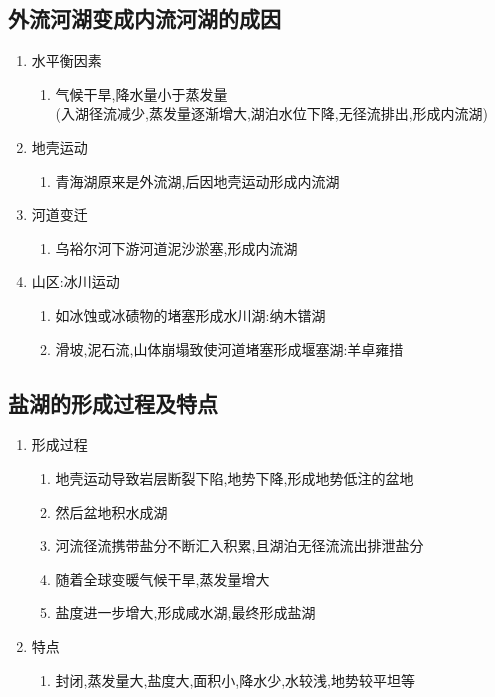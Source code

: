 \documentclass[a4paper]{article}
\begin{document}
    \subsection{外流河湖变成内流河湖的成因}
    \begin{enumerate}
        \item 水平衡因素
        \begin{enumerate}
            \item 气候干旱,降水量小于蒸发量\\(入湖径流减少,蒸发量逐渐增大,湖泊水位下降,无径流排出,形成内流湖)
        \end{enumerate}
        \item 地壳运动
        \begin{enumerate}
            \item 青海湖原来是外流湖,后因地壳运动形成内流湖
        \end{enumerate}
        \item 河道变迁
        \begin{enumerate}
            \item 乌裕尔河下游河道泥沙淤塞,形成内流湖
        \end{enumerate}
        \item 山区:冰川运动
        \begin{enumerate}
            \item 如冰蚀或冰碛物的堵塞形成水川湖:纳木镨湖
            \item 滑坡,泥石流,山体崩塌致使河道堵塞形成堰塞湖:羊卓雍措
        \end{enumerate}
    \end{enumerate}
    \subsection{盐湖的形成过程及特点}
    \begin{enumerate}
        \item 形成过程
        \begin{enumerate}
            \item 地壳运动导致岩层断裂下陷,地势下降,形成地势低注的盆地
            \item 然后盆地积水成湖
            \item 河流径流携带盐分不断汇入积累,且湖泊无径流流出排泄盐分
            \item 随着全球变暖气候干旱,蒸发量增大
            \item 盐度进一步增大,形成咸水湖,最终形成盐湖
        \end{enumerate}
        \item 特点
        \begin{enumerate}
            \item 封闭,蒸发量大,盐度大,面积小,降水少,水较浅,地势较平坦等
        \end{enumerate}
    \end{enumerate}
\end{document}
